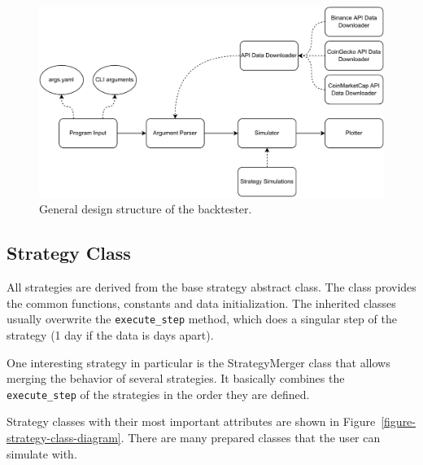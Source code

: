 \begin{figure}[!t]
    \centering
    \includegraphics[width=\columnwidth]{figures/structure-diagram.pdf}
    \caption{General design structure of the backtester.}
    \label{structure-diagram}
\end{figure}

\subsection*{Strategy Class}
All strategies are derived from the base strategy abstract class. The class provides the common functions, constants and data initialization. The inherited classes usually overwrite the \texttt{execute\_step} method, which does a singular step of the strategy (1 day if the data is days apart).

One interesting strategy in particular is the StrategyMerger class that allows merging the behavior of several strategies. It basically combines the \texttt{execute\_step} of the strategies in the order they are defined.

Strategy classes with their most important attributes are shown in Figure~\ref{figure-strategy-class-diagram}. There are many prepared classes that the user can simulate with.

